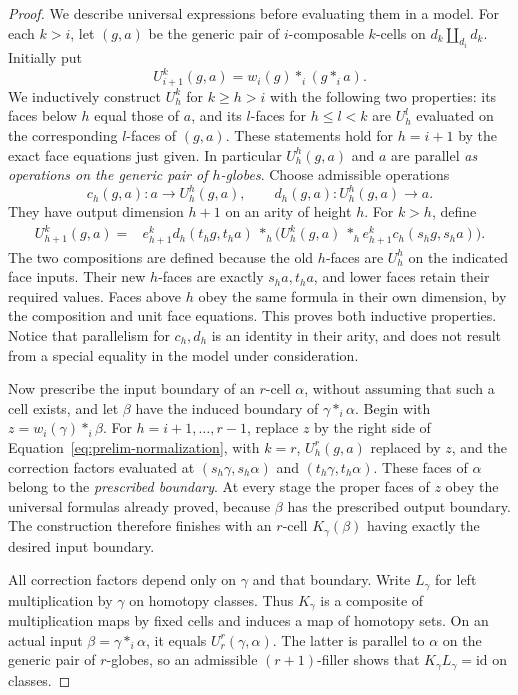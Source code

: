 \documentclass[11pt,letterpaper]{article}
\numberwithin{equation}{section}
\theoremstyle{plain}
\theoremstyle{definition}
\theoremstyle{remark}
\begin{document}
\begin{proof}
We describe universal expressions before evaluating them in a model.
For each $k>i$, let $(g,a)$ be the generic pair of $i$-composable
$k$-cells on $d_k\amalg_{d_i}d_k$.  Initially put
\[
 U_{i+1}^k(g,a)=w_i(g)*_i(g*_i a).
\]
We inductively construct $U_h^k$ for $k\ge h>i$ with the following
two properties: its faces below $h$ equal those of $a$, and its
$l$-faces for $h\le l<k$ are $U_h^l$ evaluated on the corresponding
$l$-faces of $(g,a)$.  These statements hold for $h=i+1$ by the
exact face equations just given.  In particular $U_h^h(g,a)$ and
$a$ are parallel \emph{as operations on the generic pair of
$h$-globes}.  Choose admissible operations
\[
 c_h(g,a):a\longrightarrow U_h^h(g,a),\qquad
 d_h(g,a):U_h^h(g,a)\longrightarrow a.
\]
They have output dimension $h+1$ on an arity of height $h$.
For $k>h$, define
\begin{equation}\label{eq:prelim-normalization}
 \begin{split}
 U_{h+1}^k(g,a)={}&
 e_{h+1}^k d_h(t_hg,t_ha)\ *_h\bigl(
 U_h^k(g,a)\ *_h e_{h+1}^k c_h(s_hg,s_ha)\bigr).
 \end{split}
\end{equation}
The two compositions are defined because the old $h$-faces are
$U_h^h$ on the indicated face inputs.  Their new $h$-faces are
exactly $s_ha,t_ha$, and lower faces retain their required values.
Faces above $h$ obey the same formula in their own dimension,
by the composition and unit face equations.  This proves both
inductive properties.  Notice that parallelism for $c_h,d_h$ is
an identity in their arity, and does not result from a special
equality in the model under consideration.

Now prescribe the input boundary of an $r$-cell $\alpha$, without
assuming that such a cell exists, and let $\beta$ have the induced
boundary of $\gamma*_i\alpha$.  Begin with
$z=w_i(\gamma)*_i\beta$.  For $h=i+1,\ldots,r-1$, replace $z$ by
the right side of Equation~\eqref{eq:prelim-normalization}, with
$k=r$, $U_h^r(g,a)$ replaced by $z$, and the correction factors
evaluated at $(s_h\gamma,s_h\alpha)$ and
$(t_h\gamma,t_h\alpha)$.  These faces of $\alpha$ belong to the
\emph{prescribed boundary}.  At every stage the proper faces of
$z$ obey the universal formulas already proved, because
$\beta$ has the prescribed output boundary.  The construction
therefore finishes with an $r$-cell $K_\gamma(\beta)$ having
exactly the desired input boundary.

All correction factors depend only on $\gamma$ and that boundary.
Write $L_\gamma$ for left multiplication by $\gamma$ on homotopy classes.
Thus $K_\gamma$ is a composite of multiplication maps by fixed
cells and induces a map of homotopy sets.  On an actual input
$\beta=\gamma*_i\alpha$, it equals $U_r^r(\gamma,\alpha)$.
The latter is parallel to $\alpha$ on the generic pair of
$r$-globes, so an admissible $(r+1)$-filler shows that
$K_\gamma L_\gamma=\mathrm{id}$ on classes.


\end{proof}
\end{document}
